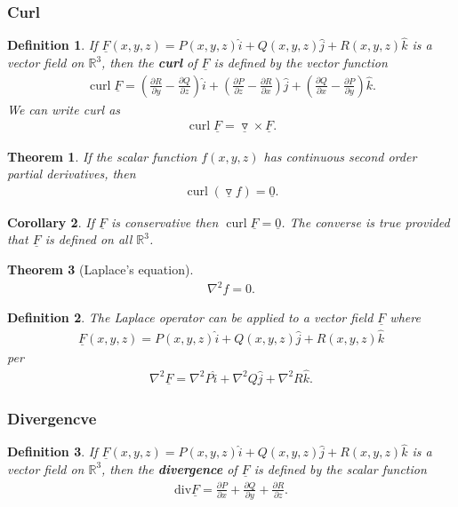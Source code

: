 \documentclass{article}
\theoremstyle{sltheorem}
\newtheorem{definition}{Definition}[section]
\newtheorem{theorem}{Theorem}[section]
\newtheorem{corollary}[theorem]{Corollary}
\newcommand{\R}{\mathbb{R}}
\newcommand{\ih}{\widehat i}
\newcommand{\jh}{\widehat j}
\newcommand{\kh}{\widehat k}
\newcommand{\grad}{\vec\triangledown}
\DeclareMathOperator{\curl}{curl}
\renewcommand{\div}{\text{div}}
\renewcommand{\vec}{\underline}
\newcommand*\B[1]{\textbf{#1}}
\begin{document}
\subsubsection{Curl}
\begin{definition}
    If $\vec F(x,y,z) = P(x,y,z)\ih + Q(x,y,z)\jh + R(x,y,z)\kh$ is a vector field
    on $\R^3$, then the \B{curl} of $\vec F$ is defined by the vector function
    \begin{align*}
        \curl\vec F = \left(\frac{\partial R}{\partial y}-\frac{\partial Q}{\partial z}\right)\ih
        +\left(\frac{\partial P}{\partial z}-\frac{\partial R}{\partial x}\right)\jh
        +\left(\frac{\partial Q}{\partial x}-\frac{\partial P}{\partial y}\right)\kh.
    \end{align*} 
    We can write curl as
    \begin{align*}
        \curl\vec F = \grad \times \vec F.
    \end{align*}
\end{definition}
\begin{theorem}
    If the scalar function $f(x,y,z)$ has continuous second order partial derivatives,
    then
    \begin{align*}
        \curl(\grad f) = \vec 0.
    \end{align*}
\end{theorem}
\begin{corollary}
    If $\vec F$ is conservative then $\curl\vec F = \vec 0$. The converse is true
    provided that $\vec F$ is defined on all $\R^3$.
\end{corollary}
\begin{theorem}[Laplace's equation]
    \begin{align*}
        \nabla^2 f = 0.
    \end{align*}
\end{theorem}
\begin{definition}
    The Laplace operator can be applied to a vector field $\vec F$ where 
    \begin{align*}
        \vec F(x,y,z) =P(x,y,z)\ih + Q(x,y,z)\jh + R(x,y,z)\kh
    \end{align*}
    per 
    \begin{align*}
        \nabla^2 \vec F = \nabla^2 P\ih + \nabla^2 Q\jh + \nabla^2 R\kh.
    \end{align*}
\end{definition}
\subsubsection{Divergencve}
\begin{definition}
    If $\vec F(x,y,z)=P(x,y,z)\ih + Q(x,y,z)\jh + R(x,y,z)\kh$ is a vector field on $\R^3$, then
    the \B{divergence} of $\vec F$ is defined by the scalar function
    \begin{align*}
        \div \vec F = \frac{\partial P}{\partial x}+\frac{\partial Q}{\partial y} + \frac{\partial R}{\partial z}.
    \end{align*}
\end{definition}
\end{document}
